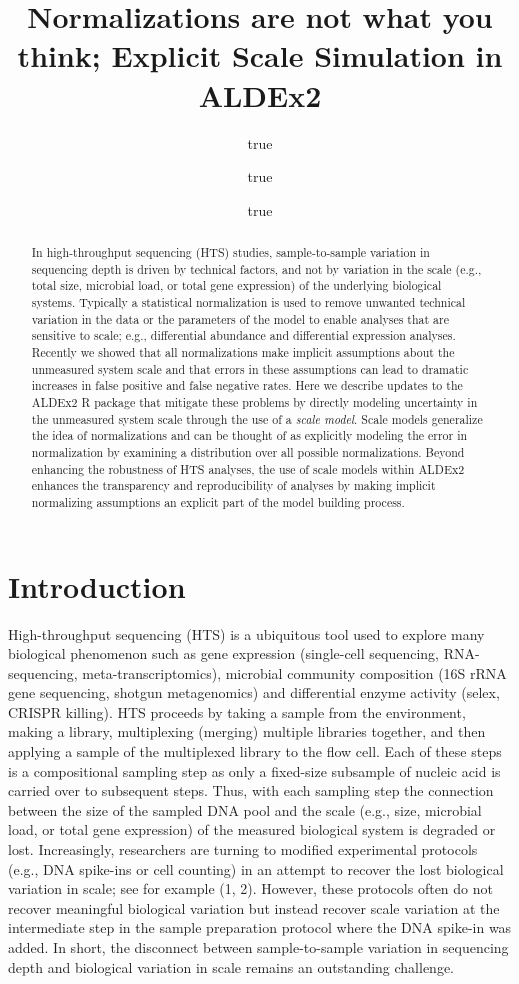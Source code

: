 \documentclass[
]{article}
\title{Normalizations are not what you think; Explicit Scale Simulation
in ALDEx2}
\author{true \and true \and true}
\date{}
\begin{document}
\maketitle
\begin{abstract}
In high-throughput sequencing (HTS) studies, sample-to-sample variation
in sequencing depth is driven by technical factors, and not by variation
in the scale (e.g., total size, microbial load, or total gene
expression) of the underlying biological systems. Typically a
statistical normalization is used to remove unwanted technical variation
in the data or the parameters of the model to enable analyses that are
sensitive to scale; e.g., differential abundance and differential
expression analyses. Recently we showed that all normalizations make
implicit assumptions about the unmeasured system scale and that errors
in these assumptions can lead to dramatic increases in false positive
and false negative rates. Here we describe updates to the ALDEx2 R
package that mitigate these problems by directly modeling uncertainty in
the unmeasured system scale through the use of a \textit{scale model}.
Scale models generalize the idea of normalizations and can be thought of
as explicitly modeling the error in normalization by examining a
distribution over all possible normalizations. Beyond enhancing the
robustness of HTS analyses, the use of scale models within ALDEx2
enhances the transparency and reproducibility of analyses by making
implicit normalizing assumptions an explicit part of the model building
process.
\end{abstract}

\section{Introduction}\label{introduction}

High-throughput sequencing (HTS) is a ubiquitous tool used to explore
many biological phenomenon such as gene expression (single-cell
sequencing, RNA-sequencing, meta-transcriptomics), microbial community
composition (16S rRNA gene sequencing, shotgun metagenomics) and
differential enzyme activity (selex, CRISPR killing). HTS proceeds by
taking a sample from the environment, making a library, multiplexing
(merging) multiple libraries together, and then applying a sample of the
multiplexed library to the flow cell. Each of these steps is a
compositional sampling step as only a fixed-size subsample of nucleic
acid is carried over to subsequent steps. Thus, with each sampling step
the connection between the size of the sampled DNA pool and the scale
(e.g., size, microbial load, or total gene expression) of the measured
biological system is degraded or lost. Increasingly, researchers are
turning to modified experimental protocols (e.g., DNA spike-ins or cell
counting) in an attempt to recover the lost biological variation in
scale; see for example (1, 2). However, these protocols often do not
recover meaningful biological variation but instead recover scale
variation at the intermediate step in the sample preparation protocol
where the DNA spike-in was added. In short, the disconnect between
sample-to-sample variation in sequencing depth and biological variation
in scale remains an outstanding challenge.
\end{document}
